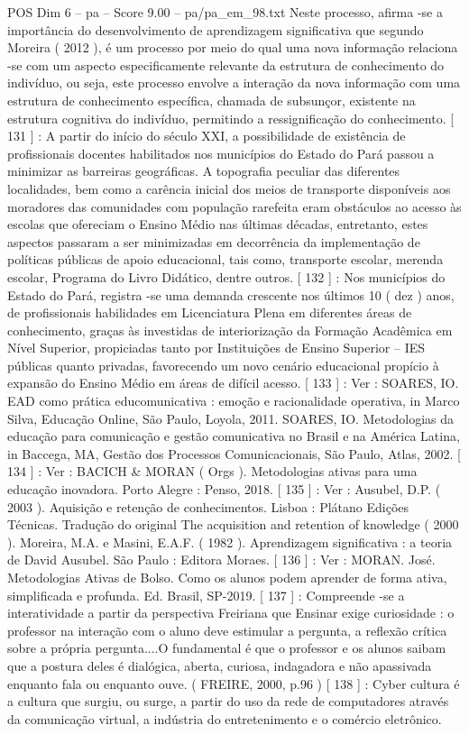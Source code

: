 \begin{textsample}{POS Dim 6 – pa – Score 9.00 – pa/pa\_em\_98.txt}
Neste processo, afirma -se a importância do desenvolvimento de aprendizagem significativa que segundo Moreira ( 2012 ), é um processo por meio do qual uma nova informação relaciona -se com um aspecto especificamente relevante da estrutura de conhecimento do indivíduo, ou seja, este processo envolve a interação da nova informação com uma estrutura de conhecimento específica, chamada de subsunçor, existente na estrutura cognitiva do indivíduo, permitindo a ressignificação do conhecimento. [ 131 ] : A partir do início do século XXI, a possibilidade de existência de profissionais docentes habilitados nos municípios do Estado do Pará passou a minimizar as barreiras geográficas.
A topografia peculiar das diferentes localidades, bem como a carência inicial dos meios de transporte disponíveis aos moradores das comunidades com população rarefeita eram obstáculos ao acesso às escolas que ofereciam o Ensino Médio nas últimas décadas, entretanto, estes aspectos passaram a ser minimizadas em decorrência da implementação de políticas públicas de apoio educacional, tais como, transporte escolar, merenda escolar, Programa do Livro Didático, dentre outros. [ 132 ] : Nos municípios do Estado do Pará, registra -se uma demanda crescente nos últimos 10 ( dez ) anos, de profissionais habilidades em Licenciatura Plena em diferentes áreas de conhecimento, graças às investidas de interiorização da Formação Acadêmica em Nível Superior, propiciadas tanto por Instituições de Ensino Superior – IES públicas quanto privadas, favorecendo um novo cenário educacional propício à expansão do Ensino Médio em áreas de difícil acesso. [ 133 ] : Ver : SOARES, IO.
EAD como prática educomunicativa : emoção e racionalidade operativa, in Marco Silva, Educação Online, São Paulo, Loyola, 2011.
SOARES, IO.
Metodologias da educação para comunicação e gestão comunicativa no Brasil e na América Latina, in Baccega, MA, Gestão dos Processos Comunicacionais, São Paulo, Atlas, 2002. [ 134 ] : Ver : BACICH \& MORAN ( Orgs ).
Metodologias ativas para uma educação inovadora.
Porto Alegre : Penso, 2018. [ 135 ] : Ver : Ausubel, D.P. ( 2003 ).
Aquisição e retenção de conhecimentos.
Lisboa : Plátano Edições Técnicas.
Tradução do original The acquisition and retention of knowledge ( 2000 ).
Moreira, M.A. e Masini, E.A.F. ( 1982 ).
Aprendizagem significativa : a teoria de David Ausubel.
São Paulo : Editora Moraes. [ 136 ] : Ver : MORAN.
José.
Metodologias Ativas de Bolso.
Como os alunos podem aprender de forma ativa, simplificada e profunda.
Ed.
Brasil, SP-2019. [ 137 ] : Compreende -se a interatividade a partir da perspectiva Freiriana que Ensinar exige curiosidade : o professor na interação com o aluno deve estimular a pergunta, a reflexão crítica sobre a própria pergunta....O fundamental é que o professor e os alunos saibam que a postura deles é dialógica, aberta, curiosa, indagadora e não apassivada enquanto fala ou enquanto ouve. ( FREIRE, 2000, p.96 ) [ 138 ] : Cyber cultura é a cultura que surgiu, ou surge, a partir do uso da rede de computadores através da comunicação virtual, a indústria do entretenimento e o comércio eletrônico.

\end{textsample}
